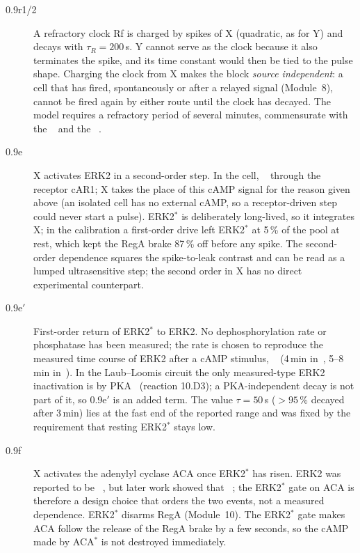 \begin{description}
\item[0.9r1/2] A refractory clock Rf is charged by spikes of X (quadratic, as for Y) and decays with $\tau_R=200$\,s. Y cannot serve as the clock because it also terminates the spike, and its time constant would then be tied to the pulse shape. Charging the clock from X makes the block \emph{source independent}: a cell that has fired, spontaneously or after a relayed signal (Module~8), cannot be fired again by either route until the clock has decayed. The model requires a refractory period of several minutes, commensurate with the ~\cite{maeda2004} and the ~\cite{ford2023}.
\item[0.9e] X activates ERK2 in a second-order step. In the cell, ~\cite{maeda1996,laub1998,maeda2004} through the receptor cAR1; X takes the place of this cAMP signal for the reason given above (an isolated cell has no external cAMP, so a receptor-driven step could never start a pulse). ERK2$^*$ is deliberately long-lived, so it integrates X; in the calibration a first-order drive left ERK2$^*$ at 5\,\% of the pool at rest, which kept the RegA brake 87\,\% off before any spike. The second-order dependence squares the spike-to-leak contrast and can be read as a lumped ultrasensitive step; the second order in X has no direct experimental counterpart.
\item[0.9e$'$] First-order return of ERK2$^*$ to ERK2. No dephosphorylation rate or phosphatase has been measured; the rate is chosen to reproduce the measured time course of ERK2 after a cAMP stimulus, ~\cite{maeda1996,laub1998,aubry1997} (4\,min in~\cite{maeda1996}, 5--8\,min in~\cite{aubry1997}). In the Laub--Loomis circuit the only measured-type ERK2 inactivation is by PKA~\cite{laub1998} (reaction 10.D3); a PKA-independent decay is not part of it, so 0.9e$'$ is an added term. The value $\tau=50$\,s ($>\!95\,\%$ decayed after 3\,min) lies at the fast end of the reported range and was fixed by the requirement that resting ERK2$^*$ stays low.
\item[0.9f] X activates the adenylyl cyclase ACA once ERK2$^*$ has risen. ERK2 was reported to be ~\cite{segall1995}, but later work showed that ~\cite{maeda2004}; the ERK2$^*$ gate on ACA is therefore a design choice that orders the two events, not a measured dependence. ERK2$^*$ disarms RegA (Module~10). The ERK2$^*$ gate makes ACA follow the release of the RegA brake by a few seconds, so the cAMP made by ACA$^*$ is not destroyed immediately.
\end{description}

